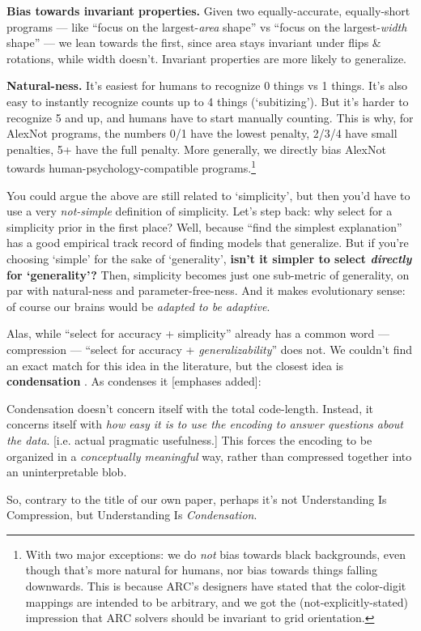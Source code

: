\documentclass[11pt]{article}
\renewenvironment{quote}
  {\begin{tcolorbox}[enhanced, breakable, sharp corners, frame hidden,
     colback=quotebg, borderline west={3pt}{0pt}{quotebar},
     left=8pt, right=8pt, top=5pt, bottom=5pt,
     before upper={\setlength{\parskip}{0.6em}}]}
  {\end{tcolorbox}}
\begin{document}
\textbf{Bias towards invariant properties.} Given two equally-accurate, equally-short programs — like ``focus on the largest-\textit{area} shape'' vs ``focus on the largest-\textit{width} shape'' — we lean towards the first, since area stays invariant under flips \& rotations, while width doesn't. Invariant properties are more likely to generalize.

\textbf{Natural-ness.} It's easiest for humans to recognize 0 things vs 1 things. It's also easy to instantly recognize counts up to 4 things (`subitizing'). But it's harder to recognize 5 and up, and humans have to start manually counting. This is why, for AlexNot programs, the numbers 0/1 have the lowest penalty, 2/3/4 have small penalties, 5+ have the full penalty. More generally, we directly bias AlexNot towards human-psychology-compatible programs.\footnote{With two major exceptions: we do \textit{not} bias towards black backgrounds, even though that's more natural for humans, nor bias towards things falling downwards. This is because ARC's designers have stated that the color-digit mappings are intended to be arbitrary, and we got the (not-explicitly-stated) impression that ARC solvers should be invariant to grid orientation.}

You could argue the above are still related to `simplicity', but then you'd have to use a very \textit{not-simple} definition of simplicity. Let's step back: why select for a simplicity prior in the first place? Well, because ``find the simplest explanation'' has a good empirical track record of finding models that generalize. But if you're choosing `simple' for the sake of `generality', \textbf{isn't it simpler to select \textit{directly} for `generality'?} Then, simplicity becomes just one sub-metric of generality, on par with natural-ness and parameter-free-ness. And it makes evolutionary sense: of course our brains would be \textit{adapted to be adaptive}.

Alas, while ``select for accuracy + simplicity'' already has a common word — compression — ``select for accuracy + \textit{generalizability}'' does not. We couldn't find an exact match for this idea in the literature, but the closest idea is \textbf{condensation} \citep{eisenstat_condensation}. As \citet{demski_condensation} condenses it [emphases added]:
\begin{quote}
Condensation doesn't concern itself with the total code-length. Instead, it concerns itself with \textit{how easy it is to use the encoding to answer questions about the data}. [i.e. actual pragmatic usefulness.] This forces the encoding to be organized in a \textit{conceptually meaningful} way, rather than compressed together into an uninterpretable blob.
\end{quote}
So, contrary to the title of our own paper, perhaps it's not Understanding Is Compression, but Understanding Is \textit{Condensation}.
\end{document}

